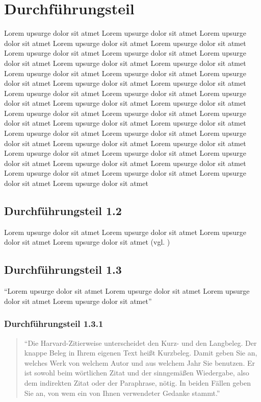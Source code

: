 \section{Durchführungsteil}

Lorem upsurge dolor sit atmet Lorem upsurge dolor sit atmet Lorem upsurge dolor sit atmet Lorem upsurge dolor sit atmet Lorem upsurge dolor sit atmet Lorem upsurge dolor sit atmet Lorem upsurge dolor sit atmet Lorem upsurge dolor sit atmet Lorem upsurge dolor sit atmet Lorem upsurge dolor sit atmet Lorem upsurge dolor sit atmet Lorem upsurge dolor sit atmet Lorem upsurge dolor sit atmet Lorem upsurge dolor sit atmet Lorem upsurge dolor sit atmet Lorem upsurge dolor sit atmet Lorem upsurge dolor sit atmet Lorem upsurge dolor sit atmet Lorem upsurge dolor sit atmet Lorem upsurge dolor sit atmet Lorem upsurge dolor sit atmet Lorem upsurge dolor sit atmet Lorem upsurge dolor sit atmet Lorem upsurge dolor sit atmet Lorem upsurge dolor sit atmet Lorem upsurge dolor sit atmet Lorem upsurge dolor sit atmet Lorem upsurge dolor sit atmet Lorem upsurge dolor sit atmet Lorem upsurge dolor sit atmet Lorem upsurge dolor sit atmet Lorem upsurge dolor sit atmet Lorem upsurge dolor sit atmet Lorem upsurge dolor sit atmet Lorem upsurge dolor sit atmet Lorem upsurge dolor sit atmet Lorem upsurge dolor sit atmet Lorem upsurge dolor sit atmet Lorem upsurge dolor sit atmet 

\subsection{Durchführungsteil 1.2}
Lorem upsurge dolor sit atmet Lorem upsurge dolor sit atmet Lorem upsurge dolor sit atmet Lorem upsurge dolor sit atmet (vgl. \cite{samplebook})
\subsection{Durchführungsteil 1.3}
\enquote{Lorem upsurge dolor sit atmet Lorem upsurge dolor sit atmet Lorem upsurge dolor sit atmet Lorem upsurge dolor sit atmet} \parencite[S. 55]{sample:2}
\subsubsection{Durchführungsteil 1.3.1}
\blockquote{\enquote{Die Harvard-Zitierweise unterscheidet den Kurz- und den Langbeleg. Der knappe Beleg in Ihrem eigenen Text heißt Kurzbeleg. Damit geben Sie an, welches Werk von welchem Autor und aus welchem Jahr Sie benutzen. Er ist sowohl beim wörtlichen Zitat und der sinngemäßen Wiedergabe, also dem indirekten Zitat oder der Paraphrase, nötig. In beiden Fällen geben Sie an, von wem ein von Ihnen verwendeter Gedanke stammt.} \parencite{samplesite:2021}}